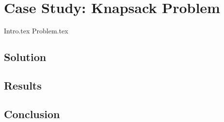 \chapter{Case Study: Knapsack Problem}
\label{chap:knapsack}
  {Intro.tex}
  {Problem.tex}
  
  \section{Solution}
  \label{sec:knapsack:sol}

  \Blindtext
  
  \section{Results}
  \label{sec:knapsack:res}
  
  \Blindtext

  \section{Conclusion}
  \label{sec:knapsack:concl}
  
  \Blindtext
